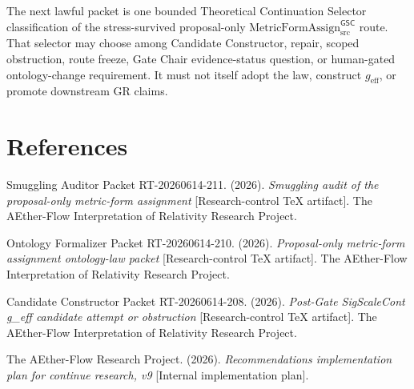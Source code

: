 \documentclass[11pt]{article}
\newcommand{\geff}{g_{\mathrm{eff}}}
\newcommand{\MetricFormAssign}{\mathrm{MetricFormAssign}_{\mathrm{src}}^{\mathsf{GSC}}}
\begin{document}
The next lawful packet is one bounded Theoretical Continuation Selector
classification of the stress-survived proposal-only \(\MetricFormAssign\)
route. That selector may choose among Candidate Constructor, repair, scoped
obstruction, route freeze, Gate Chair evidence-status question, or
human-gated ontology-change requirement. It must not itself adopt the law,
construct \(\geff\), or promote downstream GR claims.

\section*{References}

Smuggling Auditor Packet RT-20260614-211. (2026). \textit{Smuggling audit of
the proposal-only metric-form assignment} [Research-control TeX artifact].
The AEther-Flow Interpretation of Relativity Research Project.

Ontology Formalizer Packet RT-20260614-210. (2026). \textit{Proposal-only
metric-form assignment ontology-law packet} [Research-control TeX artifact].
The AEther-Flow Interpretation of Relativity Research Project.

Candidate Constructor Packet RT-20260614-208. (2026). \textit{Post-Gate
SigScaleCont g\_eff candidate attempt or obstruction} [Research-control TeX
artifact]. The AEther-Flow Interpretation of Relativity Research Project.

The AEther-Flow Research Project. (2026). \textit{Recommendations
implementation plan for continue research, v9} [Internal implementation plan].
\end{document}
